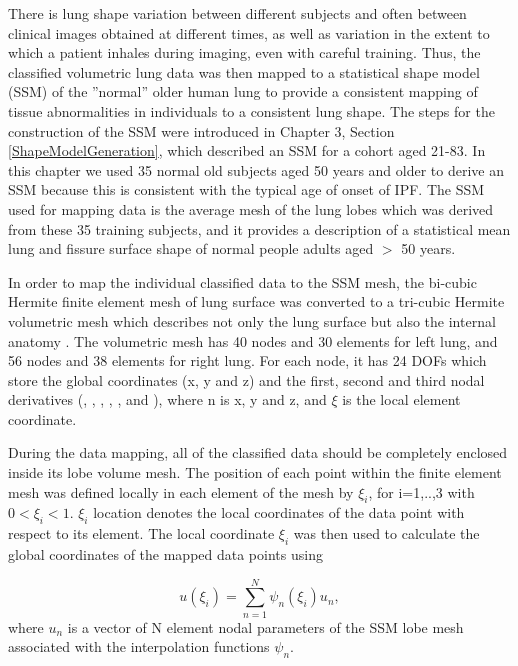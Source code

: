 There is lung shape variation between different subjects and often between clinical images obtained at different times, as well as variation in the extent to which a patient inhales during imaging, even with careful training. Thus, the classified volumetric lung data was then mapped to a statistical shape model (SSM) of the ''normal'' older human lung to provide a consistent mapping of tissue abnormalities in individuals to a consistent lung shape. The steps for the construction of the SSM were introduced in Chapter 3, Section \ref{ShapeModelGeneration}, which described an SSM for a cohort aged 21-83. In this chapter we used 35 normal old subjects aged 50 years and older to derive an SSM because this is consistent with the typical age of onset of IPF. The SSM used for mapping data is the average mesh of the lung lobes which was derived from these 35 training subjects, and it provides a description of a statistical mean lung and fissure surface shape of normal people adults aged $>$ 50 years.

In order to map the individual classified data to the SSM mesh, the bi-cubic Hermite finite element mesh of lung surface was converted to a tri-cubic Hermite volumetric mesh which describes not only the lung surface but also the internal anatomy \citep{tawhai2003developing}. The volumetric mesh has 40 nodes and 30 elements for left lung, and 56 nodes and 38 elements for right lung. For each node, it has 24 DOFs which store the global coordinates (x, y and z) and the first, second and third nodal derivatives (, , , , ,  and ), where n is x, y and z, and $\xi$ is the local element coordinate.

During the data mapping, all of the classified data should be completely enclosed inside its lobe volume mesh. The position of each point within the finite element mesh was defined locally in each element of the mesh by $\xi_{i}$, for i=1,..,3 with $0<\xi_{i}<1$. $\xi_{i}$ location denotes the local coordinates of the data point with respect to its element. The local coordinate $\xi_{i}$ was then used to calculate the global coordinates of the mapped data points using

\begin{equation}
u(\xi_{i}) = \sum_{n=1}^{N} \psi_n(\xi_{i})u_n,
\end{equation}
where $u_n$ is a vector of N element nodal parameters of the SSM lobe mesh associated with the interpolation functions $\psi_{n}$. 

